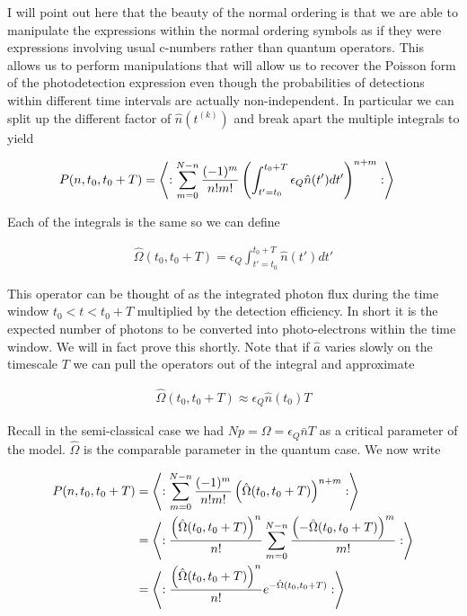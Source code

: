 \documentclass[12pt]{article}
\begin{document}
 I will point out here that the beauty of the normal ordering is that we are able to manipulate the expressions within the normal ordering symbols as if they were expressions involving usual c-numbers rather than quantum operators. This allows us to perform manipulations that will allow us to recover the Poisson form of the photodetection expression even though the probabilities of detections within different time intervals are actually non-independent. In particular we can split up the different factor of $\hat{n}\left(t^{(k)}\right)$ and break apart the multiple integrals to yield
 
 \begin{align}
 P(n,t_0,t_0+T) &= \Braket{: \sum_{m=0}^{N-n}\frac{(-1)^m}{n! m!} \left(\int_{t'=t_0}^{t_0+T} \epsilon_Q \hat{n}(t') dt'\right)^{n+m} :}
 \end{align}

Each of the integrals is the same so we can define

\begin{align}
\hat{\Omega}(t_0,t_0+T) = \epsilon_Q \int_{t' = t_0}^{t_0+T} \hat{n}(t')dt'
\end{align}

This operator can be thought of as the integrated photon flux during the time window $t_0 < t< t_0+T$ multiplied by the detection efficiency. In short it is the expected number of photons to be converted into photo-electrons within the time window. We will in fact prove this shortly. Note that if $\hat{a}$ varies slowly on the timescale $T$ we can pull the operators out of the integral and approximate

\begin{align}
\hat{\Omega}(t_0,t_0+T) \approx \epsilon_Q \hat{n}(t_0)T
\end{align}

Recall in the semi-classical case we had $N p = \Omega = \epsilon_Q \bar{n} T$ as a critical parameter of the model. $\hat{\Omega}$ is the comparable parameter in the quantum case. We now write

\begin{align}
P(n,t_0,t_0+T) &= \Braket{:\sum_{m=0}^{N-n} \frac{(-1)^m}{n! m!}\left(\hat{\Omega}(t_0,t_0+T)\right)^{n+m}:}\\
&=\Braket{:\frac{\left(\hat{\Omega}(t_0,t_0+T)\right)^n}{n!}\sum_{m=0}^{N-n} \frac{\left(-\hat{\Omega}(t_0,t_0+T)\right)^m}{m!} :}\\
&= \Braket{:\frac{\left(\hat{\Omega}(t_0,t_0+T)\right)^n}{n!}e^{-\hat{\Omega}(t_0,t_0+T)} :}
\end{align}
\end{document}
